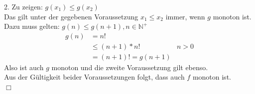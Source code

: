 2. Zu zeigen: $g(x_1) \leq g(x_2) $ \\
Das gilt unter der gegebenen Voraussetzung $ x_1 \leq x_2 $ immer,
wenn $g$ monoton ist. \\
Dazu muss gelten: $g(n) \leq g(n+1), n \in \mathbb{N}^+ $ \\
\begin{align*}
g(n) &= n! &\\
&\leq (n+1) * n! & n > 0\\
& =(n+1)!= g(n+1)&
\end{align*}
Also ist auch $g$ monoton und die zweite Voraussetzung gilt ebenso.\\

Aus der Gültigkeit beider Voraussetzungen folgt, dass auch $f$ monoton ist.\\
$\Box$



%
%
%
%
